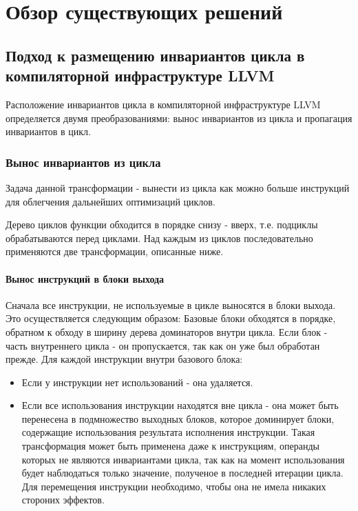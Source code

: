 \chapter{Обзор существующих решений}
\label{sec:Chapter2} 

\section{Подход к размещению инвариантов цикла в компиляторной инфраструктуре LLVM}

Расположение инвариантов цикла в компиляторной инфраструктуре LLVM определяется двумя преобразованиями: вынос инвариантов из цикла и пропагация инвариантов в цикл.

\subsection{Вынос инвариантов из цикла}

Задача данной трансформации - вынести из цикла как можно больше инструкций для облегчения дальнейших оптимизаций циклов.

Дерево циклов функции обходится в порядке снизу - вверх, т.е. подциклы обрабатываются перед циклами.
Над каждым из циклов последовательно применяются две трансформации, описанные ниже.

\subsubsection{Вынос инструкций в блоки выхода}

Сначала все инструкции, не используемые в цикле выносятся в блоки выхода.
Это осуществляется следующим образом:
Базовые блоки обходятся в порядке, обратном к обходу в ширину дерева доминаторов внутри цикла.
Если блок - часть внутреннего цикла - он пропускается, так как он уже был обработан прежде.
Для каждой инструкции внутри базового блока:
\begin{itemize}
    \item Если у инструкции нет использований - она удаляется.
    \item Если все использования инструкции находятся вне цикла - она может быть перенесена в подмножество выходных блоков, которое доминирует блоки, содержащие использования результата исполнения инструкции.
        Такая трансформация может быть применена даже к инструкциям, операнды которых не являются инвариантами цикла, так как на момент использования будет наблюдаться только значение, полученое в последней итерации цикла.
        Для перемещения инструкции необходимо, чтобы она не имела никаких стороних эффектов.
\end{itemize}

